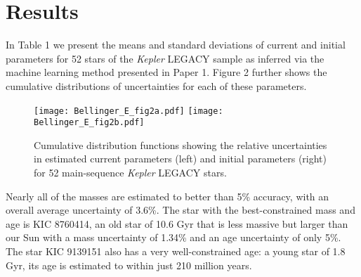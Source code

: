 \documentclass[epj,twocolumn]{webofc}
\begin{document}
\section{Results} \label{results} 
%
In Table 1 we present the means and standard deviations of current and initial parameters for 52 stars of the \emph{Kepler} LEGACY sample as inferred via the machine learning method presented in Paper 1. Figure 2 further shows the cumulative distributions of uncertainties for each of these parameters. 
%
\begin{figure*}
%
    \texttt{[image: Bellinger\_E\_fig2a.pdf]}%
    \texttt{[image: Bellinger\_E\_fig2b.pdf]}
    \caption{Cumulative distribution functions showing the relative uncertainties in estimated current parameters (left) and initial parameters (right) for 52 main-sequence \emph{Kepler} LEGACY stars.}
    \label{fig:cdf}
\end{figure*}
%
Nearly all of the masses are estimated to better than 5\% accuracy, with an overall average uncertainty of 3.6\%. The star with the best-constrained mass and age is KIC 8760414, an old star of 10.6 Gyr that is less massive but larger than our Sun with a mass uncertainty of 1.34\% and an age uncertainty of only 5\%. The star KIC 9139151 also has a very well-constrained age: a young star of 1.8 Gyr, its age is estimated to within just 210 million years. 
\end{document}
